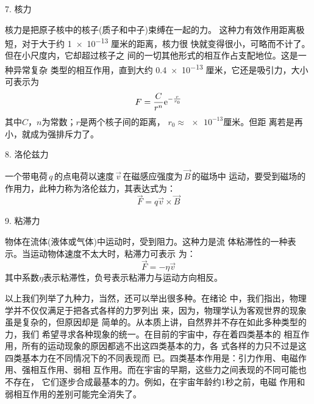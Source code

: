 \textsf{7. 核力}

核力是把原子核中的核子(质子和中子)束缚在一起的力。
这种力有效作用距离极短，对于大于约 \num{1e-13} 厘米的距离，核力很
快就变得很小，可略而不计了。但在小尺度内，它却超过核子之
间的一切其他形式的相互作占支配地位。这是一种异常复杂
类型的相互作用，直到大约 \num{0.4e-13} 厘米，它还是吸引力，大小可表示为
\begin{equation}\label{eqn:03.04.06}
  F = \frac { C } { r ^ { n } } \mathrm e ^ { - \frac { r } { r_0 } }
\end{equation}
其中$ C $，$ n $为常数；$ r $是两个核子间的距离， $ r _ { 0 } \approx \num{e-13} $厘米。但距
离若是再小，就成为强排斥力了。

\textsf{8. 洛伦兹力}

一个带电荷\,$ q $\,的点电荷以速度\,$\vec{v}$\,在磁感应强度为\,$\vec{B}$\,的磁场中
运动，\!要受到磁场的作用力，\!此种力称为洛伦兹力，\!其表达式为：
\begin{equation}\label{eqn:03.04.07}
  \vec{F} = q \vec{v} \times \vec{B}
\end{equation}

\textsf{9. 粘滞力}

物体在流体(液体或气体)中运动时，受到阻力。这种力是流
体粘滞性的一种表示。当运动物体速度不太大时，粘滞力可表示
为：\vspace{-1em}
\begin{equation}\label{eqn:03.04.08}
  \vec{F} = - \eta \vec{v}
\end{equation}
其中系数$\eta$表示粘滞性，负号表示粘滞力与运动方向相反。

以上我们列举了九种力，当然，还可以举出很多种。在绪论
中，我们指出，物理学并不仅仅满足于把各式各样的力罗列出
来，因为，物理学认为客观世界的现象虽是复杂的，但原因却是
简单的。从本质上讲，自然界并不存在如此多种类型的力，我们
希望寻求各种现象的统一。在目前的宇宙中，存在着四类基本的
相互作用，所有的运动现象的原因都逃不出这四类基本的力，各
式各样的力只不过是这四类基本力在不同情况下的不同表现而
已。四类基本作用是：引力作用、电磁作用、强相互作用、弱相
互作用。而在宇宙的早期，这些力之间表现的不同可能也不存在，
它们逐步合成最基本的力。例如，在宇宙年龄约1秒之前，电磁
作用和弱相互作用的差别可能完全消失了。



